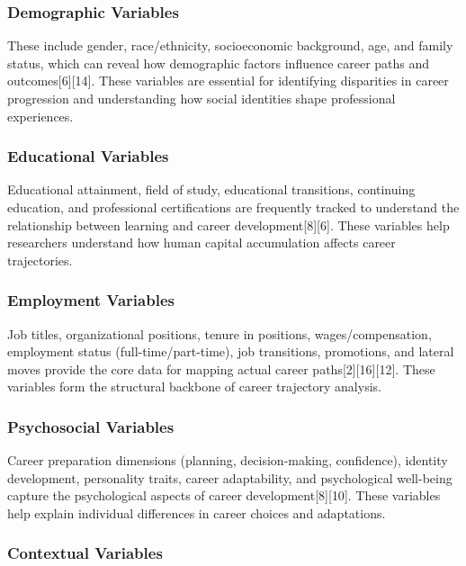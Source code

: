 \documentclass[
  letterpaper,
  DIV=11,
  numbers=noendperiod]{scrartcl}
\begin{document}
\subsubsection{Demographic Variables}\label{demographic-variables}

These include gender, race/ethnicity, socioeconomic background, age, and
family status, which can reveal how demographic factors influence career
paths and outcomes{[}6{]}{[}14{]}. These variables are essential for
identifying disparities in career progression and understanding how
social identities shape professional experiences.

\subsubsection{Educational Variables}\label{educational-variables}

Educational attainment, field of study, educational transitions,
continuing education, and professional certifications are frequently
tracked to understand the relationship between learning and career
development{[}8{]}{[}6{]}. These variables help researchers understand
how human capital accumulation affects career trajectories.

\subsubsection{Employment Variables}\label{employment-variables}

Job titles, organizational positions, tenure in positions,
wages/compensation, employment status (full-time/part-time), job
transitions, promotions, and lateral moves provide the core data for
mapping actual career paths{[}2{]}{[}16{]}{[}12{]}. These variables form
the structural backbone of career trajectory analysis.

\subsubsection{Psychosocial Variables}\label{psychosocial-variables}

Career preparation dimensions (planning, decision-making, confidence),
identity development, personality traits, career adaptability, and
psychological well-being capture the psychological aspects of career
development{[}8{]}{[}10{]}. These variables help explain individual
differences in career choices and adaptations.

\subsubsection{Contextual Variables}\label{contextual-variables}
\end{document}
